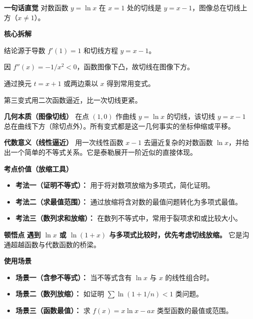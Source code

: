 \begin{explanationbox}
\textbf{\textcolor{CExplanation}{一句话直觉}}
对数函数 $y=\ln x$ 在 $x=1$ 处的切线是 $y=x-1$，图像总在切线上方（$x\neq1$）。

\medskip
\textbf{\textcolor{CExplanation}{核心拆解}}
\begin{description}[style=nextline, leftmargin=2.8em, labelsep=0.5em, itemsep=0.45em]
    \item[\textbf{要点一（切线构造）：}] 结论源于导数 $f'(1)=1$ 和切线方程 $y=x-1$。
    \item[\textbf{要点二（函数凹凸性）：}] 因 $f''(x)=-1/x^2<0$，函数图像下凸，故切线在图像下方。
    \item[\textbf{要点三（恒等变形）：}] 通过换元 $t=x+1$ 或两边乘以 $x$ 得到常用变式。
    \item[\textbf{要点四（精度提升）：}] 第三变式用二次函数逼近，比一次切线更紧。
\end{description}

\medskip
\textbf{\textcolor{CExplanation}{几何本质（图像切线）}}
在点 $(1,0)$ 作曲线 $y=\ln x$ 的切线，该切线 $y=x-1$ 总在曲线下方（除切点外）。所有变式都是这一几何事实的坐标伸缩或平移。

\medskip
\textbf{\textcolor{CExplanation}{代数意义（线性逼近）}}
用一次线性函数 $x-1$ 去逼近复杂的对数函数 $\ln x$，并给出一个简单的不等式关系。它是泰勒展开一阶近似的直接体现。

\medskip
\textbf{\textcolor{CExplanation}{考点价值（放缩工具）}}
\begin{itemize}[leftmargin=*, itemsep=0.5em, topsep=0.4em]
    \item \textbf{考法一（证明不等式）：} 用于将对数项放缩为多项式，简化证明。
    \item \textbf{考法二（求最值范围）：} 通过放缩将含对数的最值问题转化为多项式最值。
    \item \textbf{考法三（数列求和放缩）：} 在数列不等式中，常用于裂项求和或比较大小。
\end{itemize}

\medskip
\textbf{\textcolor{CExplanation}{顿悟点}}
\textbf{遇到 $\ln x$ 或 $\ln(1+x)$ 与多项式比较时，优先考虑切线放缩。} 它是沟通超越函数与代数函数的桥梁。

\medskip
\textbf{\textcolor{CExplanation}{使用场景}}
\begin{itemize}[leftmargin=*, itemsep=0.5em, topsep=0.4em]
    \item \textbf{场景一（含参不等式）：} 当不等式含有 $\ln x$ 与 $x$ 的线性组合时。
    \item \textbf{场景二（数列放缩）：} 如证明 $\sum \ln(1+1/n) < 1$ 类问题。
    \item \textbf{场景三（函数最值）：} 求 $f(x)=x\ln x - ax$ 类型函数的最值或范围。
\end{itemize}
\end{explanationbox}
